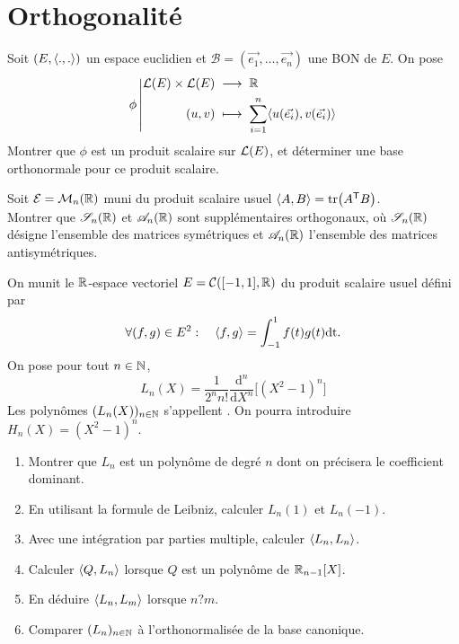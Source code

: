 \documentclass{book}
\begin{document}
\section{Orthogonalité}
 \begin{Exercice}[*]

Soit $(E,\langle.,.\rangle )$ un espace euclidien et $\mathcal{B} =(\vec{e_1},\dots,\vec{e_n})$ une BON de $E$.
On pose \[ {\phi}\left|\begin{aligned}{\mathcal{L}(E)\times\mathcal{L}(E)}&\;\longrightarrow\;{\mathbb{R}}\\{(u,v)}&\;\longmapsto\;{\sum_{i=1}^n \langle u(\vec{e_i}),v(\vec{e_i})\rangle}\end{aligned}\right. \]
Montrer que $\phi$ est un produit scalaire sur $\mathcal{L}(E)$,
et déterminer une base orthonormale pour ce produit scalaire.
\end{Exercice}
 \begin{Exercice}
Soit $\mathcal{E} = \mathcal{M}_{n}(\mathbb{R})$ muni du produit scalaire usuel 
$\langle A,B\rangle = \operatorname{tr}\bigl(A^{\mathsf {T}} B\bigr)$.\\
Montrer que $ \mathscr{S}_n(\mathbb{R})$ et $\mathscr{A}_n(\mathbb{R})$ sont supplémentaires orthogonaux,
  où $\mathscr{S}_n(\mathbb{R})$ désigne l'ensemble des matrices symétriques
  et $\mathscr{A}_n(\mathbb{R})$ l'ensemble des matrices antisymétriques.
\end{Exercice}
 \begin{Exercice}
On munit le $\mathbb{R}$-espace vectoriel $E = \mathcal{C}([-1,1],\mathbb{R})$
du produit scalaire usuel défini par
\[ \forall(f,g)\in E^2 :\quad \langle f,g\rangle = \int_{-1}^1 f(t) g(t) \mathrm{dt}. \]
On pose pour tout $n\in\mathbb{N}$,
\[ L_n(X) = \frac{1}{2^n n!}\frac{\mathrm{d}^n}{\mathrm{d}X^n} \Big[ (X^2-1)^n \Big] \]
Les polynômes $(L_n(X))_{n\in\mathbb{N}}$ s'appellent .
On pourra introduire $H_n(X) = (X^2-1)^n$.
\begin{enumerate}
\item Montrer que $L_n$ est un polynôme de degré $n$
  dont on précisera le coefficient dominant.
\item En utilisant la formule de Leibniz, calculer $L_n(1)$ et $L_n(-1)$.
\item Avec une intégration par parties multiple, calculer $\langle L_n,L_n\rangle$.
\item Calculer $\langle Q,L_n\rangle$ lorsque $Q$ est un polynôme de $\mathbb{R}_{n-1}[X]$.
\item En déduire $\langle L_n,L_m\rangle$ lorsque $n?m$.
\item Comparer $(L_n)_{n\in\mathbb{N}}$ à l'orthonormalisée de la base canonique.
\end{enumerate}
\end{Exercice}
\end{document}
